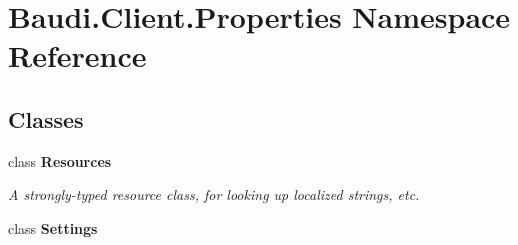 \hypertarget{namespace_baudi_1_1_client_1_1_properties}{}\section{Baudi.\+Client.\+Properties Namespace Reference}
\label{namespace_baudi_1_1_client_1_1_properties}
\subsection*{Classes}
\begin{DoxyCompactItemize}
\item 
class {\bfseries Resources}
\begin{DoxyCompactList}\small\item\em A strongly-\/typed resource class, for looking up localized strings, etc. \end{DoxyCompactList}\item 
class {\bfseries Settings}
\end{DoxyCompactItemize}
